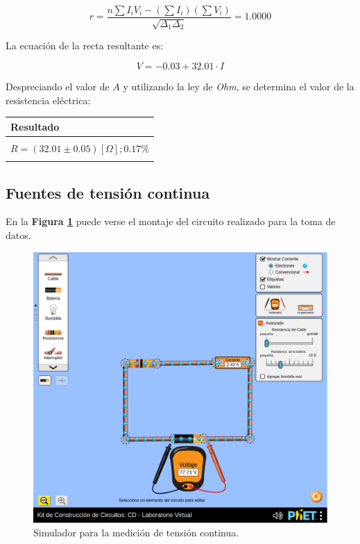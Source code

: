\documentclass[letter,11pt]{article}
\begin{document}
\begin{equation*}
    r = \frac{n \sum I_i V_i - (\sum I_i)(\sum V_i)}{\sqrt{\Delta_1 \Delta_2}} = 1.0000
\end{equation*}

La ecuación de la recta resultante es:

\begin{equation*}
    V = -0.03 + 32.01 \cdot I
\end{equation*}

Despreciando el valor de $A$ y utilizando la ley de \emph{Ohm}, se determina el
valor de la resistencia eléctrica:

\begin{center}
\begin{tabular}{|>{\centering}m{11.0cm}<{\centering}|}
\hline
\textbf{Resultado}
\tabularnewline \hline
\\
$R = (32.01 \pm 0.05) [\Omega]; 0.17 \%$ \tabularnewline
\\
\hline
\end{tabular}
\end{center}

\subsection{Fuentes de tensión continua}
En la \textbf{Figura \ref{figura6}} puede verse el montaje del circuito
realizado para la toma de datos.

\begin{figure}[!h]
\centering
\includegraphics[scale=0.40]{resources/figura6.eps}
\caption{Simulador para la medición de tensión continua.}
\label{figura6}
\end{figure}
\end{document}
